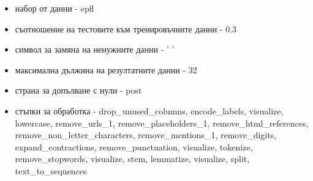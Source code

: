 \documentclass{article}
\begin{document}
\begin{itemize}
  \begin{itemize}
    \item набор от данни - epfl
    \item съотношение на тестовите към тренировъчните данни - 0.3
    \item символ за замяна на ненужните данни - ' '
    \item максимална дължина на резултатните данни - 32
    \item страна за допълване с нули - post
    \item стъпки за обработка - drop\_unused\_columns, encode\_labels, visualize, lowercase, remove\_urls\_1,
    remove\_placeholders\_1, remove\_html\_references, remove\_non\_letter\_characters, remove\_mentions\_1,
    remove\_digits, expand\_contractions, remove\_punctuation, visualize, tokenize, remove\_stopwords, visualize,
    stem, lemmatize, visualize, split, text\_to\_sequences
  \end{itemize}


\end{itemize}
\end{document}
